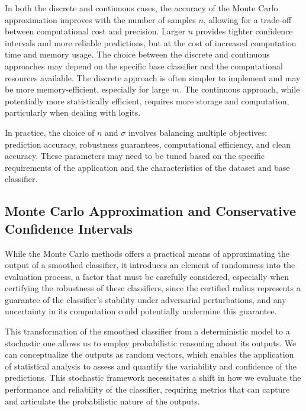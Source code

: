 In both the discrete and continuous cases, the accuracy of the Monte Carlo approximation improves with the number of samples $n$, allowing for a trade-off between computational cost and precision.
Larger $n$ provides tighter confidence intervals and more reliable predictions, but at the cost of increased computation time and memory usage.
The choice between the discrete and continuous approaches may depend on the specific base classifier and the computational resources available.
The discrete approach is often simpler to implement and may be more memory-efficient, especially for large $m$.
The continuous approach, while potentially more statistically efficient, requires more storage and computation, particularly when dealing with logits.

In practice, the choice of $n$ and $\sigma$ involves balancing multiple objectives: prediction accuracy, robustness guarantees, computational efficiency, and clean accuracy.
These parameters may need to be tuned based on the specific requirements of the application and the characteristics of the dataset and base classifier.

\subsection{Monte Carlo Approximation and Conservative Confidence Intervals}\label{subsec:monte-carlo-approximation-and-conservative-confidence-intervals}

While the Monte Carlo methods offers a practical means of approximating the output of a smoothed classifier, it introduces an element of randomness into the evaluation process, a factor that must be carefully considered, especially when certifying the robustness of these classifiers, since the certified radius represents a guarantee of the classifier's stability under adversarial perturbations, and any uncertainty in its computation could potentially undermine this guarantee.

This transformation of the smoothed classifier from a deterministic model to a stochastic one allows us to employ probabilistic reasoning about its outputs.
We can conceptualize the outputs as random vectors, which enables the application of statistical analysis to assess and quantify the variability and confidence of the predictions.
This stochastic framework necessitates a shift in how we evaluate the performance and reliability of the classifier, requiring metrics that can capture and articulate the probabilistic nature of the outputs.

